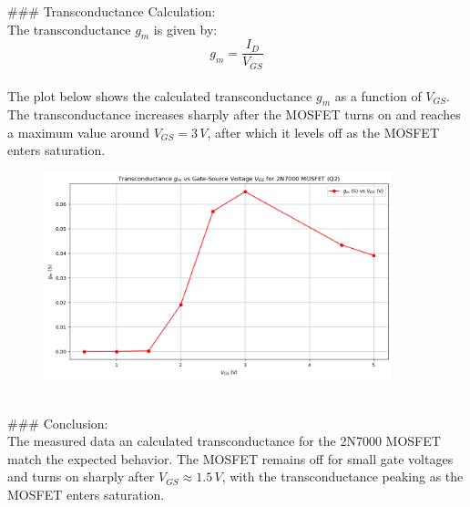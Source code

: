 \documentclass{article}
\begin{document}
### Transconductance Calculation: \\ 
The transconductance \( g_m \) is given by: \\ 
\[
g_m = \frac{I_D}{V_{GS}}
\]
\\ 
The plot below shows the calculated transconductance \( g_m \) as a function of \( V_{GS} \). The transconductance increases sharply after the MOSFET turns on and reaches a maximum value around \( V_{GS} = 3 \, V \), after which it levels off as the MOSFET enters saturation.
\\
\begin{figure}[H]
    \centering
    \includegraphics[width=0.9\textwidth]{./img/Lab6_2_gmVSVgs.png}
    \caption{}
    \label{fig:graph1} 
\end{figure}
\\ 
### Conclusion: \\ 
The measured data an calculated transconductance for the 2N7000 MOSFET match the expected behavior. The MOSFET remains off for small gate voltages and turns on sharply after \( V_{GS} \approx 1.5 \, V \), with the transconductance peaking as the MOSFET enters saturation.
\end{document}
